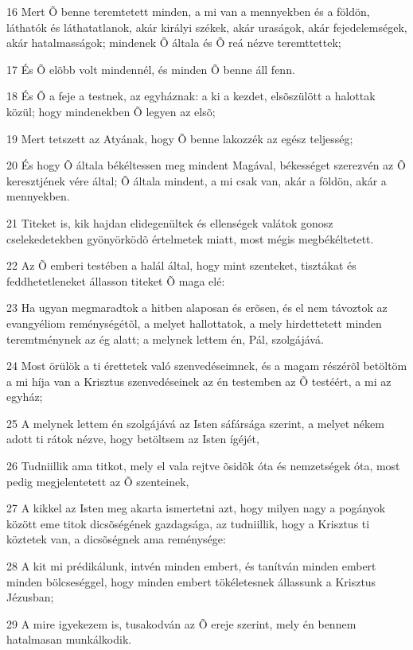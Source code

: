 \par 16 Mert Õ benne teremtetett minden, a mi van a mennyekben és a földön, láthatók és láthatatlanok, akár királyi székek, akár uraságok, akár fejedelemségek, akár hatalmasságok; mindenek Õ általa és Õ reá nézve teremttettek;
\par 17 És Õ elõbb volt mindennél, és minden Õ benne áll fenn.
\par 18 És Õ a feje a testnek, az egyháznak: a ki a kezdet, elsõszülött a halottak közül; hogy mindenekben Õ legyen az elsõ;
\par 19 Mert tetszett az Atyának, hogy Õ benne lakozzék az egész teljesség;
\par 20 És hogy Õ általa békéltessen meg mindent Magával, békességet szerezvén az Õ keresztjének vére által; Õ általa mindent, a mi csak van, akár a földön, akár a mennyekben.
\par 21 Titeket is, kik hajdan elidegenültek és ellenségek valátok gonosz cselekedetekben gyönyörködõ értelmetek miatt, most mégis megbékéltetett.
\par 22 Az Õ emberi testében a halál által, hogy mint szenteket, tisztákat és feddhetetleneket állasson titeket Õ maga elé:
\par 23 Ha ugyan megmaradtok a hitben alaposan és erõsen, és el nem távoztok az evangyéliom reménységétõl, a melyet hallottatok, a mely hirdettetett minden teremtménynek az ég alatt; a melynek lettem én, Pál, szolgájává.
\par 24 Most örülök a ti érettetek való szenvedéseimnek, és a magam részérõl betöltöm a mi híja van a Krisztus szenvedéseinek az én testemben az Õ testéért, a mi az egyház;
\par 25 A melynek lettem én szolgájává az Isten sáfársága szerint, a melyet nékem adott ti rátok nézve, hogy betöltsem az Isten ígéjét,
\par 26 Tudniillik ama titkot, mely el vala rejtve õsidõk óta és nemzetségek óta, most pedig megjelentetett az Õ szenteinek,
\par 27 A kikkel az Isten meg akarta ismertetni azt, hogy milyen nagy a pogányok között eme titok dicsõségének gazdagsága, az tudniillik, hogy a Krisztus ti köztetek van, a dicsõségnek ama reménysége:
\par 28 A kit mi prédikálunk, intvén minden embert, és tanítván minden embert minden bölcseséggel, hogy minden embert tökéletesnek állassunk a Krisztus Jézusban;
\par 29 A mire igyekezem is, tusakodván az Õ ereje szerint, mely én bennem hatalmasan munkálkodik.

